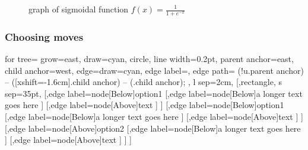 \documentclass{beamer}
\begin{document}
\begin{frame}

	\begin{figure}
		\centering
	
		\caption{graph of sigmoidal function $f(x)=\frac{1}{1+e^{-x}}$ \label{sigmoid}}
\end{figure}
\end{frame}

\begin{frame}
	\frametitle{Choosing moves}

	\begin{forest} 
		for tree={
			grow=east,
			draw=cyan,
			circle,
			line width=0.2pt,
			parent anchor=east,
			child anchor=west,
			edge={draw=cyan},
			edge label={\Huge\color{black}},
			edge path={
				\noexpand{}
					(!u.parent anchor) -- ([xshift=-1.6cm].child anchor) --    
					(.child anchor);
			},
			l sep=2cm,
		} 
		[,rectangle, s sep=35pt,
			[,edge label={node[Below]{option1}}
				[,edge label={node[Below]{a longer text goes here}}
				]
				[,edge label={node[Above]{text}}
				]
			]
			[,edge label={node[Below]{option1}}
				[,edge label={node[Below]{a longer text goes here}}
				]
				[,edge label={node[Above]{text}}
				]
			]
			[,edge label={node[Above]{option2}}
				[,edge label={node[Below]{a longer text goes here}}
				]
				[,edge label={node[Above]{text}}
				]
			]
		]
		\end{forest}
\end{frame}
\end{document}
